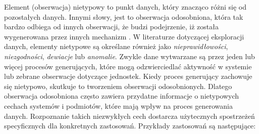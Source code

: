 \documentclass[12pt,a4paper,oneside]{book}
\theoremstyle{definition}
\begin{document}
Element (obserwacja) nietypowy  to punkt danych, który znacząco różni się od pozostałych danych. Innymi słowy, jest to obserwacja odosobniona, która tak bardzo odbiega od innych obserwacji, że budzi podejrzenie, iż została wygenerowana przez innych mechanizm \cite{Hawkins_1980}. W literaturze dotyczącej eksploracji danych, elementy nietypowe są określane również jako \textit{nieprawidłowości}, \textit{niezgodności}, \textit{dewiacje} lub \textit{anomalie}. Zwykle dane wytwarzane są przez jeden lub więcej procesów generujących, które mogą odzwierciedlać aktywność w systemie lub zebrane obserwacje dotyczące jednostek. Kiedy proces generujący zachowuje się nietypowo, skutkuje to tworzeniem obserwacji odosobnionych. Dlatego obserwacja odosobniona często zawiera przydatne informacje o nietypowych cechach systemów i podmiotów, które mają wpływ na proces generowania danych. Rozpoznanie takich niezwykłych cech dostarcza użytecznych spostrzeżeń specyficznych dla konkretnych zastosowań. Przykłady zastosowań są następujące:
\end{document}
